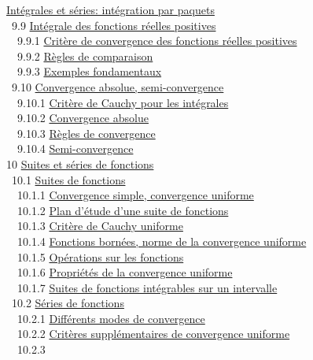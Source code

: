 \documentclass[]{article}
\begin{document}
\href{coursse57.html\#x69-3060009.8.4}{Intégrales et séries: intégration
par paquets} \\ ~9.9 \href{coursse58.html\#x70-3070009.9}{Intégrale des
fonctions réelles positives} \\ ~~9.9.1
\href{coursse58.html\#x70-3080009.9.1}{Critère de convergence des
fonctions réelles positives} \\ ~~9.9.2
\href{coursse58.html\#x70-3090009.9.2}{Règles de comparaison} \\ ~~9.9.3
\href{coursse58.html\#x70-3100009.9.3}{Exemples fondamentaux} \\ ~9.10
\href{coursse59.html\#x71-3110009.10}{Convergence absolue,
semi-convergence} \\ ~~9.10.1
\href{coursse59.html\#x71-3120009.10.1}{Critère de Cauchy pour les
intégrales} \\ ~~9.10.2
\href{coursse59.html\#x71-3130009.10.2}{Convergence absolue} \\ ~~9.10.3
\href{coursse59.html\#x71-3140009.10.3}{Règles de convergence} \\
~~9.10.4 \href{coursse59.html\#x71-3150009.10.4}{Semi-convergence} \\ 10
\href{coursch11.html\#x72-31600010}{Suites et séries de fonctions} \\
~10.1 \href{coursse60.html\#x73-31700010.1}{Suites de fonctions} \\
~~10.1.1 \href{coursse60.html\#x73-31800010.1.1}{Convergence simple,
convergence uniforme} \\ ~~10.1.2
\href{coursse60.html\#x73-31900010.1.2}{Plan d'étude d'une suite de
fonctions} \\ ~~10.1.3 \href{coursse60.html\#x73-32000010.1.3}{Critère
de Cauchy uniforme} \\ ~~10.1.4
\href{coursse60.html\#x73-32100010.1.4}{Fonctions bornées, norme de la
convergence uniforme} \\ ~~10.1.5
\href{coursse60.html\#x73-32200010.1.5}{Opérations sur les fonctions} \\
~~10.1.6 \href{coursse60.html\#x73-32300010.1.6}{Propriétés de la
convergence uniforme} \\ ~~10.1.7
\href{coursse60.html\#x73-32400010.1.7}{Suites de fonctions intégrables
sur un intervalle} \\ ~10.2 \href{coursse61.html\#x74-32500010.2}{Séries
de fonctions} \\ ~~10.2.1
\href{coursse61.html\#x74-32600010.2.1}{Différents modes de convergence}
\\ ~~10.2.2 \href{coursse61.html\#x74-32700010.2.2}{Critères
supplémentaires de convergence uniforme} \\ ~~10.2.3
\end{document}
